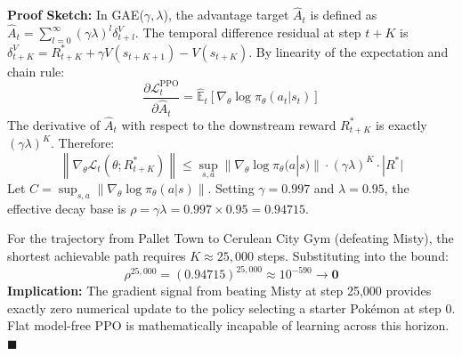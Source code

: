 \documentclass[conference]{IEEEtran}
\begin{document}
\textbf{Proof Sketch:} In GAE($\gamma, \lambda$), the advantage target $\hat{A}_t$ is defined as $\hat{A}_t = \sum_{l=0}^\infty (\gamma \lambda)^l \delta_{t+l}^V$. The temporal difference residual at step $t+K$ is $\delta_{t+K}^V = R_{t+K}^* + \gamma V(s_{t+K+1}) - V(s_{t+K})$. By linearity of the expectation and chain rule:
\begin{equation}
\frac{\partial \mathcal{L}_t^{\text{PPO}}}{\partial \hat{A}_t} = \hat{\mathbb{E}}_t \left[ \nabla_\theta \log \pi_\theta(a_t | s_t) \right]
\end{equation}
The derivative of $\hat{A}_t$ with respect to the downstream reward $R_{t+K}^*$ is exactly $(\gamma \lambda)^K$. Therefore:
\begin{equation}
\left\| \nabla_\theta \mathcal{L}_t(\theta; R_{t+K}^*) \right\| \le \sup_{s, a} \|\nabla_\theta \log \pi_\theta(a | s)\| \cdot (\gamma \lambda)^K \cdot |R^*|
\end{equation}
Let $C = \sup_{s, a} \|\nabla_\theta \log \pi_\theta(a | s)\|$. Setting $\gamma = 0.997$ and $\lambda = 0.95$, the effective decay base is $\rho = \gamma \lambda = 0.997 \times 0.95 = 0.94715$. 

For the trajectory from Pallet Town to Cerulean City Gym (defeating Misty), the shortest achievable path requires $K \approx 25{,}000$ steps. Substituting into the bound:
\begin{equation}
\rho^{25{,}000} = (0.94715)^{25{,}000} \approx 10^{-590} \to \mathbf{0}
\end{equation}
\textbf{Implication:} The gradient signal from beating Misty at step 25,000 provides exactly zero numerical update to the policy selecting a starter Pok{\'e}mon at step 0. Flat model-free PPO is mathematically incapable of learning across this horizon. $\blacksquare$
\end{document}
